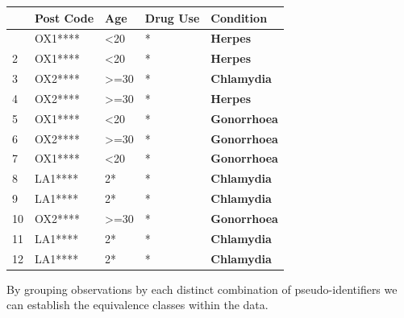 \documentclass[
  letterpaper,
  DIV=11,
  numbers=noendperiod]{scrreprt}
\begin{document}
\begin{longtable}[]{@{}lllll@{}}
\toprule\noalign{}
& Post Code & Age & Drug Use & \textbf{Condition} \\
\midrule\noalign{}
\endhead
\bottomrule\noalign{}
\endlastfoot
1 & OX1**** & \textless20 & * & \textbf{Herpes} \\
2 & OX1**** & \textless20 & * & \textbf{Herpes} \\
3 & OX2**** & \textgreater=30 & * & \textbf{Chlamydia} \\
4 & OX2**** & \textgreater=30 & * & \textbf{Herpes} \\
5 & OX1**** & \textless20 & * & \textbf{Gonorrhoea} \\
6 & OX2**** & \textgreater=30 & * & \textbf{Gonorrhoea} \\
7 & OX1**** & \textless20 & * & \textbf{Gonorrhoea} \\
8 & LA1**** & 2* & * & \textbf{Chlamydia} \\
9 & LA1**** & 2* & * & \textbf{Chlamydia} \\
10 & OX2**** & \textgreater=30 & * & \textbf{Gonorrhoea} \\
11 & LA1**** & 2* & * & \textbf{Chlamydia} \\
12 & LA1**** & 2* & * & \textbf{Chlamydia} \\
\end{longtable}

By grouping observations by each distinct combination of
pseudo-identifiers we can establish the equivalence classes within the
data.
\end{document}
